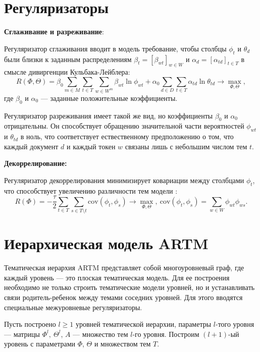 \section{Регуляризаторы}
\textbf{Сглаживание и разреживание}:

Регуляризатор сглаживания вводит в модель требование, чтобы столбцы $\phi_{t}$ и $\theta_{d}$ были близки к заданным распределениям $\beta_t = [\beta_{wt}]_{w \in W}$ и $\alpha_d = [\alpha_{td}]_{t \in T}$ в смысле дивиргенции Кульбака-Лейблера\cite{ARTM4}:
$$R(\Phi, \Theta) = \beta_0\sum_{m\in M} \sum_{t\in T}\sum_{w \in W^m} \beta_{wt}\ln \phi_{wt} + \alpha_0 \sum_{d\in D} \sum_{t\in T}\alpha_{td} \ln \theta_{td} \rightarrow 
\max\limits_{\Phi, \Theta},$$
где $\beta_0$ и $\alpha_0$ --- заданные положительные коэффициенты.

Регуляризатор разреживания имеет такой же вид, но коэффициенты $\beta_0$ и $\alpha_0$ отрицательны. Он способствует обращению значительной части вероятностей $\phi_{wt}$ и $\theta_{td}$ в ноль, что соответствует ествественному предположению о том, что каждый документ $d$ и каждый токен $w$ связаны лишь с небольшим числом тем $t$.


\textbf{Декоррелирование:}

Регуляризатор декоррелирования минимизирует ковариации между столбцами $\phi_{t}$, что способствует увеличению различности тем модели \cite{ARTM4}:
$$ R(\Phi) = -\dfrac{\tau}{2}\sum_{t \in T}\sum_{s \in T\setminus t} \text{cov}(\phi_t, \phi_s) \rightarrow 
\max\limits_{\Phi, \Theta}, \  \text{cov}(\phi_t, \phi_s) = \sum_{w \in W}\phi_{wt}\phi_{ws}.$$


\section{Иерархическая модель ARTM}

Тематическая иерархия ARTM представляет собой многоуровневый граф, где каждый уровень --- это плоская тематическая модель.
Для ее построения необходимо не только строить тематические модели уровней, но и устанавливать связи родитель-ребенок между темами соседних уровней. Для этого вводятся специальные межуровневые регуляризаторы. 

Пусть построено $l \geq 1$ уровней тематической иерархии, параметры $l$-того уровня --- матрицы $\Phi^l, \ \Theta^l$, $A$ --- множество тем $l$-го уровня. Построим $(l+1)$-ый уровень с параметрами $\Phi$, $\Theta$ и множеством тем $T$.


